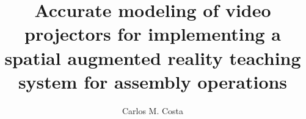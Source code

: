 









\title{\LARGE \bf
Accurate modeling of video projectors for implementing a spatial augmented reality teaching system for assembly operations
}

\author{Carlos M. Costa}

\maketitle









%










